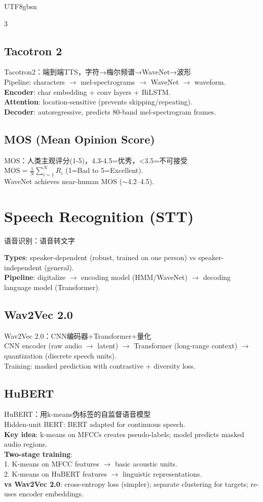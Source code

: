 \documentclass[9pt,landscape,a4paper]{article}
\newcommand{\zhint}[1]{{\scriptsize\color{gray!70!black}#1}}
\begin{document}
\begin{CJK}{UTF8}{gbsn}
\begin{multicols}{3}
\subsection{Tacotron 2}
\zhint{Tacotron2：端到端TTS，字符→梅尔频谱→WaveNet→波形}\\
Pipeline: characters $\to$ mel-spectrograms $\to$ WaveNet $\to$ waveform.\\
\textbf{Encoder}: char embedding + conv layers + BiLSTM.\\
\textbf{Attention}: location-sensitive (prevents skipping/repeating).\\
\textbf{Decoder}: autoregressive, predicts 80-band mel-spectrogram frames.

\subsection{MOS (Mean Opinion Score)}
\zhint{MOS：人类主观评分(1-5)，4.3-4.5=优秀，<3.5=不可接受}\\
$\text{MOS} = \frac{1}{N}\sum_{i=1}^{N} R_i$ (1=Bad to 5=Excellent).\\
WaveNet achieves near-human MOS ($\sim$4.2--4.5).

\section{Speech Recognition (STT)}
\zhint{语音识别：语音转文字}

\textbf{Types}: speaker-dependent (robust, trained on one person) vs speaker-independent (general).\\
\textbf{Pipeline}: digitalize $\to$ encoding model (HMM/WaveNet) $\to$ decoding language model (Transformer).

\subsection{Wav2Vec 2.0}
\zhint{Wav2Vec 2.0：CNN编码器+Transformer+量化}\\
CNN encoder (raw audio $\to$ latent) $\to$ Transformer (long-range context) $\to$ quantization (discrete speech units).\\
Training: masked prediction with contrastive + diversity loss.

\subsection{HuBERT}
\zhint{HuBERT：用k-means伪标签的自监督语音模型}\\
Hidden-unit BERT: BERT adapted for continuous speech.\\
\textbf{Key idea}: k-means on MFCCs creates pseudo-labels; model predicts masked audio regions.\\
\textbf{Two-stage training}:\\
1. K-means on MFCC features $\to$ basic acoustic units.\\
2. K-means on HuBERT features $\to$ linguistic representations.\\
\textbf{vs Wav2Vec 2.0}: cross-entropy loss (simpler); separate clustering for targets; re-uses encoder embeddings.


\end{multicols}
\end{CJK}
\end{document}
